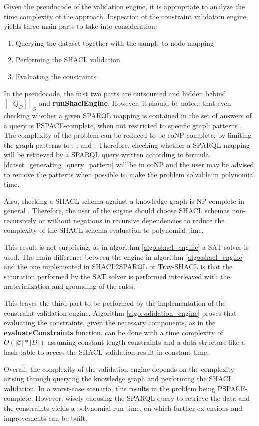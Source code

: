 Given the pseudocode of the validation engine, it is appropriate to analyze the time complexity of the approach. Inspection of the constraint validation engine yields three main parts to take into consideration:
\begin{enumerate}
    \item Querying the dataset together with the sample-to-node mapping
    \item Performing the SHACL validation
    \item Evaluating the constraints
\end{enumerate}
In the pseudocode, the first two parts are outsourced and hidden behind $[[Q_D]]_G$ and \textbf{runShaclEngine}. However, it should be noted, that even checking whether a given SPARQL mapping is contained in the set of answers of a query is PSPACE-complete, when not restricted to specific graph patterns \cite{perez2009semantics}. The complexity of the problem can be reduced to be coNP-complete, by limiting the graph patterns to , , and . Therefore, checking whether a SPARQL mapping will be retrieved by a SPARQL query written according to formula \ref{datset_generating_query_pattern} will be in coNP and the user may be advised to remove the  patterns when possible to make the problem solvable in polynomial time. 

Also, checking a SHACL schema against a knowledge graph is NP-complete in general \cite{corman2018semantics}. Therefore, the user of the engine should choose SHACL schemas non-recursively or without negations in recursive dependencies to reduce the complexity of the SHACL schema evaluation to polynomial time. 

This result is not surprising, as in algorithm \ref{algo:shacl_engine} a SAT solver is used. The main difference between the engine in algorithm \ref{algo:shacl_engine} and the one implemented in SHACL2SPARQL \cite{corman2019validating} or Trav-SHACL \cite{figuera2021trav} is that the saturation performed by the SAT solver is performed interleaved with the materialization and grounding of the rules. 

This leaves the third part to be performed by the implementation of the constraint validation engine. Algorithm \ref{algo:validation_engine} proves that evaluating the constraints, given the necessary components, as in the \textbf{evaluateConstraints} function, can be done with a time complexity of $O(|\mathcal{C}| * |D|)$ assuming constant length constraints and a data structure like a hash table to access the SHACL validation result in constant time.

Overall, the complexity of the validation engine depends on the complexity arising through querying the knowledge graph and performing the SHACL validation. In a worst-case scenario, this results in the problem being PSPACE-complete. However, wisely choosing the SPARQL query to retrieve the data and the constraints yields a polynomial run time, on which further extensions and improvements can be built.